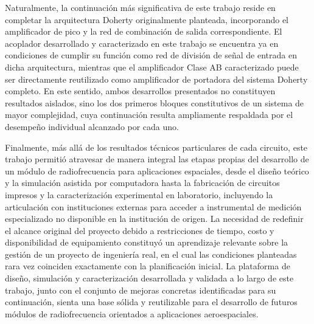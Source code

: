 Naturalmente, la continuación más significativa de este trabajo reside en completar la arquitectura Doherty originalmente planteada, incorporando el amplificador de pico y la red de combinación de salida correspondiente. El acoplador desarrollado y caracterizado en este trabajo se encuentra ya en condiciones de cumplir su función como red de división de señal de entrada en dicha arquitectura, mientras que el amplificador Clase AB caracterizado puede ser directamente reutilizado como amplificador de portadora del sistema Doherty completo. En este sentido, ambos desarrollos presentados no constituyen resultados aislados, sino los dos primeros bloques constitutivos de un sistema de mayor complejidad, cuya continuación resulta ampliamente respaldada por el desempeño individual alcanzado por cada uno.

Finalmente, más allá de los resultados técnicos particulares de cada circuito, este trabajo permitió atravesar de manera integral las etapas propias del desarrollo de un módulo de radiofrecuencia para aplicaciones espaciales, desde el diseño teórico y la simulación asistida por computadora hasta la fabricación de circuitos impresos y la caracterización experimental en laboratorio, incluyendo la articulación con instituciones externas para acceder a instrumental de medición especializado no disponible en la institución de origen. La necesidad de redefinir el alcance original del proyecto debido a restricciones de tiempo, costo y disponibilidad de equipamiento constituyó un aprendizaje relevante sobre la gestión de un proyecto de ingeniería real, en el cual las condiciones planteadas rara vez coinciden exactamente con la planificación inicial. La plataforma de diseño, simulación y caracterización desarrollada y validada a lo largo de este trabajo, junto con el conjunto de mejoras concretas identificadas para su continuación, sienta una base sólida y reutilizable para el desarrollo de futuros módulos de radiofrecuencia orientados a aplicaciones aeroespaciales.